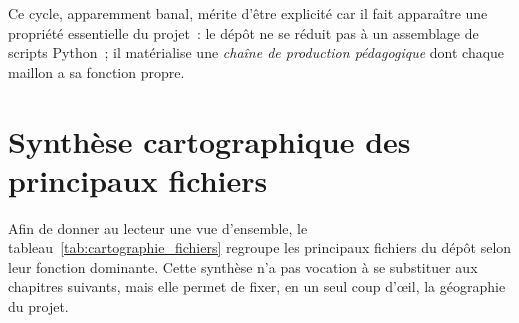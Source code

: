 \documentclass[12pt, a4paper, openany]{report}
\begin{document}
	Ce cycle, apparemment banal, mérite d’être explicité car il fait apparaître une propriété essentielle du projet~: le dépôt ne se réduit pas à un assemblage de scripts Python~; il matérialise une \emph{chaîne de production pédagogique} dont chaque maillon a sa fonction propre.
	
	\section{Synthèse cartographique des principaux fichiers}

	Afin de donner au lecteur une vue d’ensemble, le tableau~\ref{tab:cartographie_fichiers} regroupe les principaux fichiers du dépôt selon leur fonction dominante. Cette synthèse n’a pas vocation à se substituer aux chapitres suivants, mais elle permet de fixer, en un seul coup d’œil, la géographie du projet.
	
\end{document}
